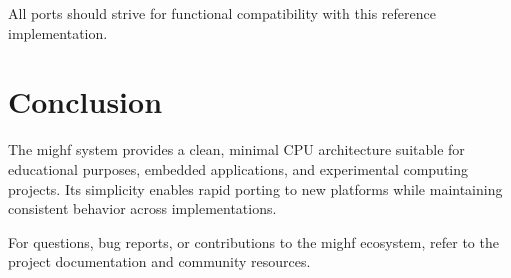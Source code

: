 \documentclass[a4paper,12pt]{article}
\begin{document}
All ports should strive for functional compatibility with this reference implementation.

\section{Conclusion}

The mighf system provides a clean, minimal CPU architecture suitable for educational purposes, embedded applications, and experimental computing projects. Its simplicity enables rapid porting to new platforms while maintaining consistent behavior across implementations.

For questions, bug reports, or contributions to the mighf ecosystem, refer to the project documentation and community resources.
\end{document}
